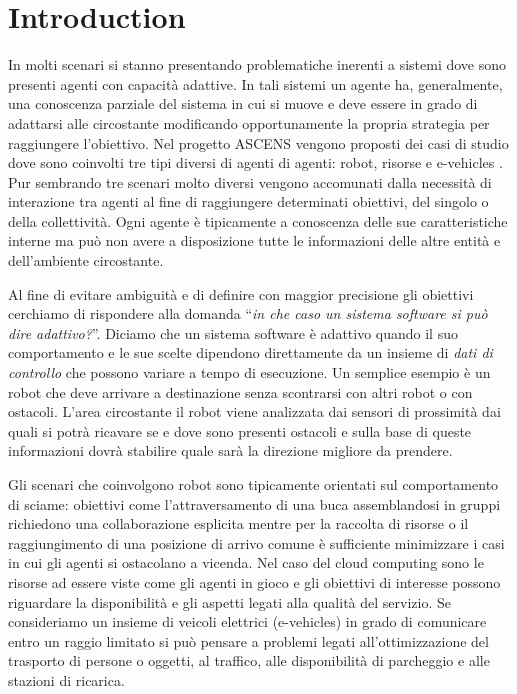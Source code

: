 \section{Introduction}
In molti scenari si stanno presentando problematiche inerenti a sistemi dove sono presenti agenti con capacità adattive. In tali sistemi un agente ha, generalmente, una conoscenza parziale del sistema in cui si muove e deve essere in grado di adattarsi alle circostante modificando opportunamente la propria strategia per raggiungere l'obiettivo. Nel progetto ASCENS vengono proposti dei casi di studio dove sono coinvolti tre tipi diversi di agenti di agenti: robot, risorse e e-vehicles \cite{ascens-wp71}. Pur sembrando tre scenari molto diversi vengono accomunati dalla necessità di interazione tra agenti al fine di raggiungere determinati obiettivi, del singolo o della collettività. Ogni agente è tipicamente a conoscenza delle sue caratteristiche interne ma può non avere a disposizione tutte le informazioni delle altre entità e dell'ambiente circostante.

Al fine di evitare ambiguità e di definire con maggior precisione gli obiettivi cerchiamo di rispondere alla domanda ``\emph{in che caso un sistema software si può dire adattivo?}''\cite{concfwada}. 
Diciamo che un sistema software è adattivo quando il suo comportamento e le sue scelte dipendono direttamente da un insieme di \emph{dati di controllo} che possono variare a tempo di esecuzione. Un semplice esempio è un robot che deve arrivare a destinazione senza scontrarsi con altri robot o con ostacoli. L'area circostante il robot viene analizzata dai sensori di prossimità dai quali si potrà ricavare se e dove sono presenti ostacoli e sulla base di queste informazioni dovrà stabilire quale sarà la direzione migliore da prendere.

Gli scenari che coinvolgono robot sono tipicamente orientati sul comportamento di sciame: obiettivi come l'attraversamento di una buca \cite{adapselfassmaude}
assemblandosi in gruppi richiedono una collaborazione esplicita mentre per la raccolta di risorse \cite{foragingscenarioklaim} o il raggiungimento di una posizione di arrivo comune è sufficiente minimizzare i casi in cui gli agenti si ostacolano a vicenda. Nel caso del cloud computing sono le risorse ad essere viste come gli agenti in gioco e gli obiettivi di interesse possono riguardare la disponibilità e gli aspetti legati alla qualità del servizio. Se consideriamo un insieme di veicoli elettrici (e-vehicles) in grado di comunicare entro un raggio limitato si può pensare a problemi legati all'ottimizzazione del trasporto di persone o oggetti, al traffico, alle disponibilità di parcheggio e alle stazioni di ricarica.

